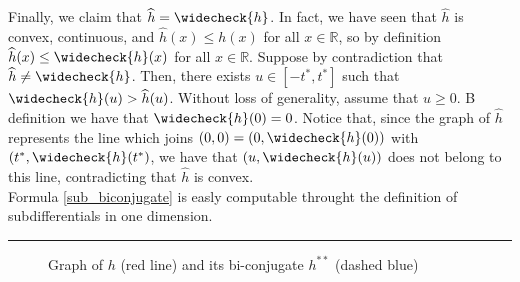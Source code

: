 \documentclass[11pt,a4paper]{amsart}
\newcommand{\kw}{\rule{2mm}{2mm}}
\renewenvironment{proof}{{Proof.}}{\hfill\kw}
\begin{document}
\begin{proof}
    Finally, we claim that $\widehat{h}=\widecheck{h}$. In fact, we have seen that $\widehat{h}$ is convex, continuous, and $\widehat{h}(x)\le h(x)$ for all $x\in\mathbb{R}$, so by definition $\widehat{h}(x)\le \widecheck{h}(x)$ for all $x\in \mathbb{R}$. Suppose by contradiction that $\widehat{h}\ne \widecheck{h}$. Then, there exists $u\in [-t^*,t^*]$ such that $\widecheck{h}(u)>\widehat{h}(u)$. Without loss of generality, assume that $u\ge 0$. B definition we have that $\widecheck{h}(0)=0$. Notice that, since the graph of $\widehat{h}$ represents the line which joins $(0,0)=(0,\widecheck{h}(0))$ with $(t^*,\widecheck{h}(t^*)$, we have that $(u,\widecheck{h}(u))$ does not belong to this line, contradicting that $\widehat{h}$ is convex.\\

    Formula \eqref{sub_biconjugate} is easly computable throught the definition of subdifferentials in one dimension.
   
\end{proof}
    
    \begin{figure}[h]
        \centering
        \caption{Graph of $h$ (red line) and its bi-conjugate $h^{**}$ (dashed blue)}
        \label{convex_example}
    \end{figure}  
\end{document}

